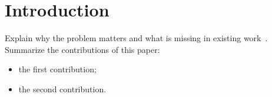 \section{Introduction}
\label{sec:intro}

Explain why the problem matters and what is missing in existing work~\cite{he2016resnet}.
Summarize the contributions of this paper:
\begin{itemize}
  \item the first contribution;
  \item the second contribution.
\end{itemize}

